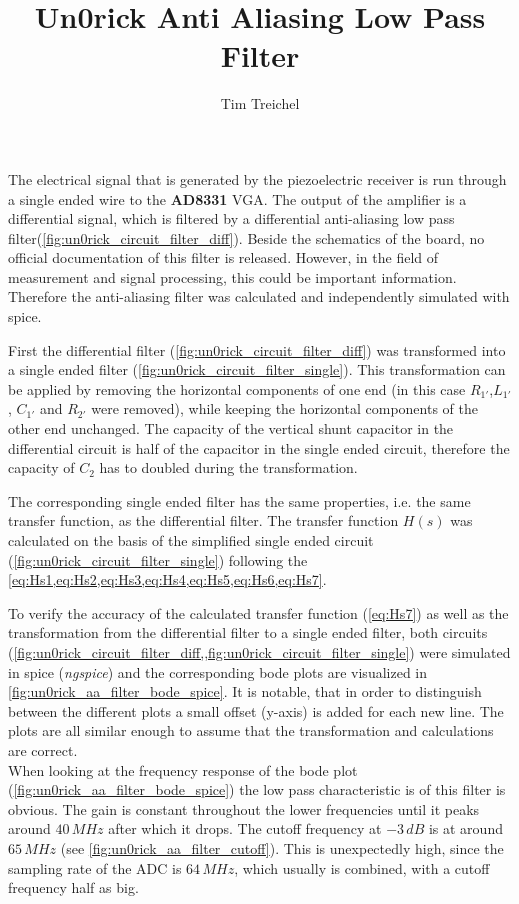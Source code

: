 \documentclass{article}
\title{Un0rick Anti Aliasing Low Pass Filter}
\author{Tim Treichel}
\begin{document}
\maketitle
The electrical signal that is generated by the piezoelectric receiver is run through a single ended wire to the \textbf{AD8331} VGA. The output of the amplifier is a differential signal, which is filtered by a differential anti-aliasing low pass filter(\cref{fig:un0rick_circuit_filter_diff}). Beside the schematics of the board, no official documentation of this filter is released. However, in the field of measurement and signal processing, this could be important information.
Therefore the anti-aliasing filter was calculated and independently simulated with spice. 

First the differential filter (\cref{fig:un0rick_circuit_filter_diff}) was transformed into a single ended filter (\cref{fig:un0rick_circuit_filter_single}). This transformation can be applied by removing the horizontal components of one end (in this case $R_{1'}$,$L_{1'}$, $C_{1'}$ and $R_{2'}$ were removed), while keeping the horizontal components of the other end unchanged. The capacity of the vertical shunt capacitor in the differential circuit is half of the capacitor in the single ended circuit, therefore the capacity of $C_2$ has to doubled during the transformation.

The corresponding single ended filter has the same properties, i.e. the same transfer function, as the differential filter. The transfer function $H(s)$ was calculated on the basis of the simplified single ended circuit (\cref{fig:un0rick_circuit_filter_single}) following the \cref{eq:Hs1,eq:Hs2,eq:Hs3,eq:Hs4,eq:Hs5,eq:Hs6,eq:Hs7}. 

To verify the accuracy of the calculated transfer function (\cref{eq:Hs7}) as well as the transformation from the differential filter to a single ended filter, both circuits (\cref{fig:un0rick_circuit_filter_diff,,fig:un0rick_circuit_filter_single}) were simulated in spice (\emph{ngspice}) and the corresponding bode plots are visualized in \cref{fig:un0rick_aa_filter_bode_spice}. It is notable, that in order to distinguish between the different plots a small offset (y-axis) is added for each new line. The plots are all similar enough to assume that the transformation and calculations are correct.\\

\noindent When looking at the frequency response of the bode plot (\cref{fig:un0rick_aa_filter_bode_spice}) the low pass characteristic is of this filter is obvious. The gain is constant throughout the lower frequencies until it peaks around $40 \, MHz$ after which it drops. The cutoff frequency at $-3 \, dB$ is at around $65 \, MHz$ (see \cref{fig:un0rick_aa_filter_cutoff}). This is unexpectedly high, since the sampling rate of the ADC is $64 \, MHz$, which usually is combined, with a cutoff frequency half as big. 
\end{document}
